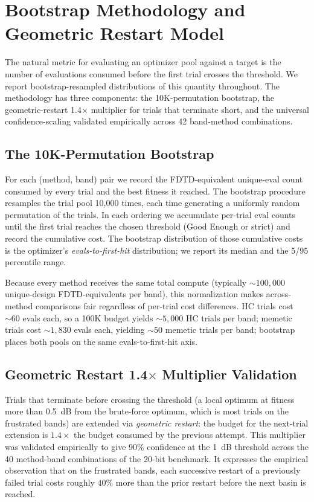 \section{Bootstrap Methodology and Geometric Restart Model}
\label{app:bootstrap}

The natural metric for evaluating an optimizer pool against a
target is the number of evaluations consumed before the first trial
crosses the threshold. We report bootstrap-resampled distributions
of this quantity throughout. The methodology has three components:
the 10K-permutation bootstrap, the geometric-restart 1.4$\times$
multiplier for trials that terminate short, and the universal
confidence-scaling validated empirically across 42 band-method
combinations.

\subsection{The 10K-Permutation Bootstrap}

For each (method, band) pair we record the FDTD-equivalent
unique-eval count consumed by every trial and the best fitness it
reached. The bootstrap procedure resamples the trial pool 10{,}000
times, each time generating a uniformly random permutation of the
trials. In each ordering we accumulate per-trial eval counts until
the first trial reaches the chosen threshold (Good Enough or strict)
and record the cumulative cost. The bootstrap distribution of those
cumulative costs is the optimizer's \emph{evals-to-first-hit}
distribution; we report its median and the 5/95 percentile range.

Because every method receives the same total compute (typically
$\sim\!100{,}000$ unique-design FDTD-equivalents per band), this
normalization makes across-method comparisons fair regardless of
per-trial cost differences. HC trials cost $\sim\!60$ evals each,
so a 100K budget yields $\sim\!5{,}000$ HC trials per band; memetic
trials cost $\sim\!1{,}830$ evals each, yielding $\sim\!50$ memetic
trials per band; bootstrap places both pools on the same
evals-to-first-hit axis.

\subsection{Geometric Restart 1.4$\times$ Multiplier Validation}

Trials that terminate before crossing the threshold (a local
optimum at fitness more than 0.5~dB from the brute-force optimum,
which is most trials on the frustrated bands) are extended via
\emph{geometric restart}: the budget for the next-trial extension
is $1.4\times$ the budget consumed by the previous attempt. This
multiplier was validated empirically to give 90\% confidence at the
1~dB threshold across the 40 method-band combinations of the 20-bit
benchmark. It expresses the empirical observation that on the
frustrated bands, each successive restart of a previously failed
trial costs roughly $40\%$ more than the prior restart before the
next basin is reached.

